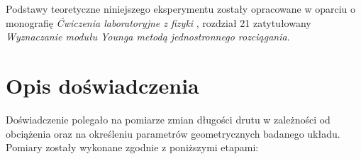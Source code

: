 \documentclass[a4paper,12pt]{article}
\begin{document}
Podstawy teoretyczne niniejszego eksperymentu zostały opracowane w oparciu o monografię \textit{Ćwiczenia laboratoryjne z fizyki} \cite{Drynski1976}, rozdział 21 zatytułowany \textit{Wyznaczanie modułu Younga metodą jednostronnego rozciągania}.




\section{Opis doświadczenia}

Doświadczenie polegało na pomiarze zmian długości drutu w zależności od obciążenia oraz na określeniu parametrów geometrycznych badanego układu. Pomiary zostały wykonane zgodnie z poniższymi etapami:
\end{document}
